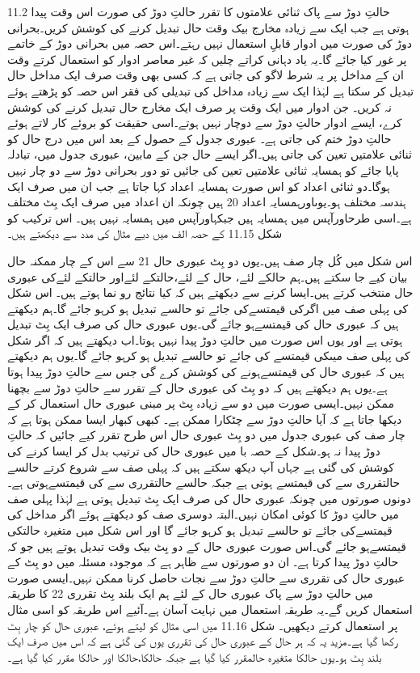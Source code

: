 11.2 حالتِ دوڑ سے پاک ثنائی علامتوں کا تقرر
	حالتِ دوڑ کی صورت اس وقت پیدا ہوتی ہے جب ایک سے زیادہ مخارج بیک وقت حال تبدیل کرنے کی کوشش کریں۔بحرانی دوڑ کی صورت میں ادوار قابلِ استعمال نہیں رہتے۔اس حصہ میں بحرانی دوڑ کے خاتمے پر غور کیا جائے گا۔یہ یاد دہانی کراتے چلیں کہ غیر معاصر ادوار کو استعمال کرتے وقت ان کے مداخل پر یہ شرط لاگو کی جاتی ہے کہ کسی بھی وقت صرف ایک مداخل حال تبدیل کر سکتا ہے لہٰذا ایک سے زیادہ مداخل کی تبدیلی کی فقر اس حصہ کو پڑھتے ہوئے نہ کریں۔
	جن ادوار میں ایک وقت پر صرف ایک مخارج حال تبدیل کرنے کی کوشش کرے، ایسے ادوار حالتِ دوڑ سے دوچار نہیں ہوتے۔اسی حقیقت کو بروئے کار لاتے ہوئے حالتِ دوڑ ختم کی جاتی ہے۔
	عبوری جدول کے حصول کے بعد اس میں درج حال  کو ثنائی علامتیں تعین کی جاتی ہیں۔اگر ایسے حال جن کے مابین، عبوری جدول میں، تبادلہ پایا جائے کو  ہمسایہ ثنائی علامتیں تعین کی جائیں تو دور بحرانی دوڑ سے دو چار نہیں ہوگا۔دو ثنائی اعداد کو اس صورت ہمسایہ اعداد کہا جاتا ہے جب ان میں صرف ایک ہندسہ مختلف ہو۔یوںاورہمسایہ اعداد 20 ہیں چونکہ ان اعداد میں صرف ایک بِٹ مختلف ہے۔اسی طرحاورآپس میں ہمسایہ ہیں جبکہاورآپس میں ہمسایہ نہیں ہیں۔
	اس ترکیب کو شکل 11.15 کے حصہ الف میں دیے مثال کی مدد سے دیکھتے ہیں۔



	اس شکل میں کُل چار صف ہیں۔یوں دو بِٹ عبوری حال  21 سے اس کے چار ممکنہ حال بیان کیے جا سکتے ہیں۔ہم حالکے لئے، حال کے لئے،حالتکے لئےاور حالتکے لئےکی عبوری حال  منتخب کرتے ہیں۔ایسا کرنے سے دیکھتے ہیں کہ کیا نتائج رو نما ہوتے ہیں۔
	اس شکل کی پہلی صف میں اگرکی قیمتسےکی جائے تو حالسے تبدیل ہو کرہو جائے گا۔ہم دیکھتے ہیں کہ عبوری حال کی قیمتسےہو جائے گی۔یوں عبوری حال  کی صرف ایک بِٹ تبدیل ہوتی ہے اور یوں اس صورت میں حالتِ دوڑ پیدا نہیں ہوتا۔اب دیکھتے ہیں کہ اگر شکل کی پہلی صف میںکی قیمتسے کی جائے تو حالسے تبدیل ہو کرہو جائے گا۔یوں ہم دیکھتے ہیں کہ عبوری حال کی قیمتسےہونے کی کوشش کرے گی جس سے حالتِ دوڑ پیدا ہوتا ہے۔یوں ہم دیکھتے ہیں کہ دو بِٹ کی عبوری حال  کے تقرر سے حالتِ دوڑ سے بچھنا ممکن نہیں۔ایسی صورت میں دو سے زیادہ بِٹ پر مبنی عبوری حال  استعمال کر کے دیکھا جاتا ہے کہ آیا حالتِ دوڑ سے چٹکارا ممکن ہے۔
	کبھی کبھار ایسا ممکن ہوتا ہے کہ چار صف کی عبوری جدول میں دو بِٹ عبوری حال  اس طرح تقرر کیے جائیں کہ حالتِ دوڑ پیدا نہ ہو۔شکل کے حصہ با میں عبوری حال  کی ترتیب بدل کر ایسا کرنے کی کوشش کی گئی ہے جہاں آپ دیکھ سکتے ہیں کہ پہلی صف سے شروع کرتے حالسے حالتقرری سے کی قیمتسے ہوتی ہے جبکہ حالسے حالتقرری سے کی قیمتسےہوتی ہے۔دونوں صورتوں میں چونکہ عبوری حال  کی صرف ایک بِٹ تبدیل ہوتی ہے لہٰذا پہلی صف میں حالتِ دوڑ کا کوئی امکان نہیں۔البتہ دوسری صف کو دیکھتے ہوئے اگر مداخل کی قیمتسےکی جائے تو حالسے تبدیل ہو کرہو جائے گا اور اس شکل میں متغیرہ حالتکی قیمتسےہو جائے گی۔اس صورت عبوری حال  کے دو بِٹ بیک وقت تبدیل ہوتے ہیں جو کہ حالتِ دوڑ پیدا کرتا ہے۔
	ان دو صورتوں سے ظاہر ہے کہ موجودہ مسئلہ میں دو بِٹ کے عبوری حال  کی تقرری سے حالتِ دوڑ سے نجات حاصل کرنا ممکن نہیں۔ایسی صورت میں حالتِ دوڑ سے پاک عبوری حال  کے لئے ہم ایک بلند بِٹ تقرری 22 کا طریقہ استعمال کریں گے۔یہ طریقہ استعمال میں نہایت آسان ہے۔آئیے اس طریقہ کو اسی مثال پر استعمال کرتے دیکھیں۔
	شکل 11.16 میں اسی مثال کو لیتے ہوئے، عبوری حال  کو چار بِٹ رکھا گیا ہے۔مزید یہ کہ ہر حال کے عبوری حال  کی تقرری یوں کی گئی ہے کہ اس میں صرف ایک بلند بِٹ ہو۔یوں حالکا متغیرہ حالمقرر کیا گیا ہے جبکہ حالکا،حالکا  اور حالکا مقرر کیا گیا ہے۔


